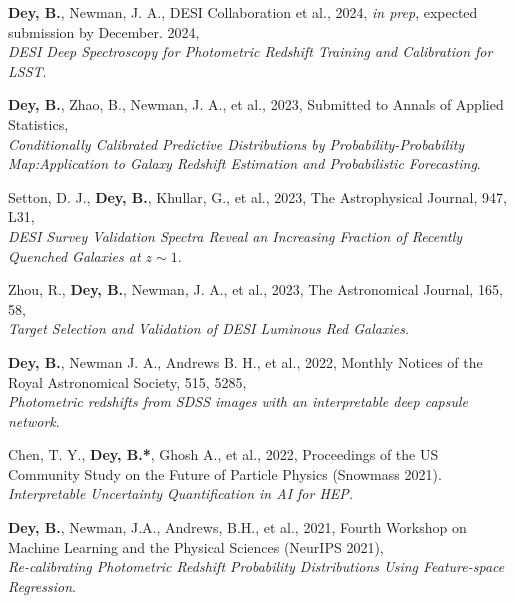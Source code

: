    \item \textbf{Dey, B.}, Newman, J. A., DESI Collaboration et al., 2024, \textit{in prep}, expected submission by December. 2024,\\
    \textrm{\textit{DESI Deep Spectroscopy for Photometric Redshift Training and Calibration for LSST}}. %
    
    
    \item  \textbf{Dey, B.}, Zhao, B., Newman, J. A., et al., 2023, Submitted to Annals of Applied Statistics,\\ \textit{Conditionally Calibrated Predictive Distributions by Probability-Probability Map:Application to Galaxy Redshift Estimation and Probabilistic Forecasting}. 
    
    \item Setton, D. J., \textbf{Dey, B.}, Khullar, G., et al., 2023, The Astrophysical Journal, 947, L31, \\ \textit{DESI Survey Validation Spectra Reveal an Increasing Fraction of Recently Quenched Galaxies at $z\sim1$}.
    
    \item Zhou, R., \textbf{Dey, B.}, Newman, J. A., et al., 2023, The Astronomical Journal, 165, 58, \\ \textit{Target Selection and Validation of DESI Luminous Red Galaxies}.
    
    \item  \textbf{Dey, B.}, Newman J. A., Andrews B. H., et al., 2022, Monthly Notices of the Royal Astronomical Society, 515, 5285, \\ \textit{Photometric redshifts from SDSS images with an interpretable deep capsule network}. 

    \item Chen, T. Y., \textbf{Dey, B.*}, Ghosh A., et al., 2022, Proceedings of the US Community Study on the Future of Particle Physics (Snowmass 2021). \\ \textit{Interpretable Uncertainty Quantification in AI for HEP.}
    
    
   
    \item \textbf{Dey, B.}, Newman, J.A., Andrews, B.H., et al., 2021, Fourth Workshop on Machine Learning and the Physical Sciences (NeurIPS 2021),\\ \textit{Re-calibrating Photometric Redshift Probability Distributions Using Feature-space Regression}. 
    
